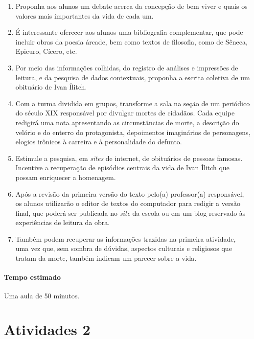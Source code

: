 \documentclass[12pt]{extarticle}
\begin{document}
\begin{enumerate}

\item Proponha aos alunos um debate acerca da concepção
de bem viver e quais os valores mais importantes da vida de cada um.

\item É interessante oferecer
aos alunos uma bibliografia complementar, que pode incluir obras da
poesia árcade, bem como textos de filosofia, como de Sêneca, Epicuro,
Cícero, etc.

\item Por meio das informações colhidas, do
registro de análises e impressões de leitura, e da pesquisa de dados
contextuais, proponha a escrita coletiva de um obituário de
Ivan Ílitch.

\item Com a turma dividida em grupos, transforme a sala na
seção de um periódico do século XIX responsável por divulgar mortes de
cidadãos. Cada equipe redigirá uma nota apresentando as circunstâncias
de morte, a descrição do velório e do enterro do protagonista,
depoimentos imaginários de personagens, elogios irônicos à carreira e
à personalidade do defunto. 

\item Estimule a pesquisa, em \emph{sites} de
internet, de obituários de pessoas famosas. Incentive a
recuperação de episódios centrais da vida de Ivan Ílitch que possam
enriquecer a homenagem. 

\item Após a revisão da primeira versão do texto
pelo(a) professor(a) responsável, os alunos utilizarão o editor de
textos do computador para redigir a versão final, que poderá ser
publicada no \emph{site} da escola ou em um blog reservado às
experiências de leitura da obra.

\item Também podem recuperar as informações trazidas na
primeira atividade, uma vez que, sem sombra de dúvidas, aspectos
culturais e religiosos que tratam da morte, também indicam um parecer
sobre a vida.

\end{enumerate}

\paragraph{Tempo estimado} Uma aula de 50 minutos.

\section{Atividades 2}
\end{document}
